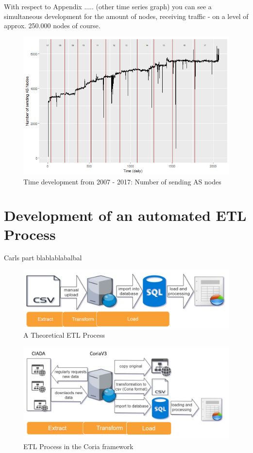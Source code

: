 \documentclass[conference]{IEEEtran}
\begin{document}
With respect to Appendix ..... (other time series graph) you can see a simultaneous development for the amount of nodes, receiving traffic - on a level of approx. 250.000 nodes of course. 




\begin{figure}[htbp]
\centerline{\includegraphics[scale=0.4]{Graphics/ASFromAll.png}}
\caption{Time development from 2007 - 2017: Number of sending AS nodes}
\label{fig}
\end{figure}


\section{Development of an automated ETL Process}

Carls part blablablabalbal



\begin{figure}[htbp]
\centerline{\includegraphics[scale=0.29]{Graphics/ETL1.PNG}}
\caption{A Theoretical ETL Process}
\label{fig}
\end{figure}

\begin{figure}[htbp]
\centerline{\includegraphics[scale=0.4]{Graphics/ETL2.PNG}}
\caption{ETL Process in the Coria framework}
\label{fig}
\end{figure}
\end{document}
